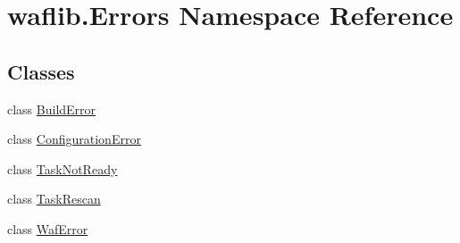 \hypertarget{namespacewaflib_1_1_errors}{}\section{waflib.\+Errors Namespace Reference}
\label{namespacewaflib_1_1_errors}
\subsection*{Classes}
\begin{DoxyCompactItemize}
\item 
class \hyperlink{classwaflib_1_1_errors_1_1_build_error}{Build\+Error}
\item 
class \hyperlink{classwaflib_1_1_errors_1_1_configuration_error}{Configuration\+Error}
\item 
class \hyperlink{classwaflib_1_1_errors_1_1_task_not_ready}{Task\+Not\+Ready}
\item 
class \hyperlink{classwaflib_1_1_errors_1_1_task_rescan}{Task\+Rescan}
\item 
class \hyperlink{classwaflib_1_1_errors_1_1_waf_error}{Waf\+Error}
\end{DoxyCompactItemize}
